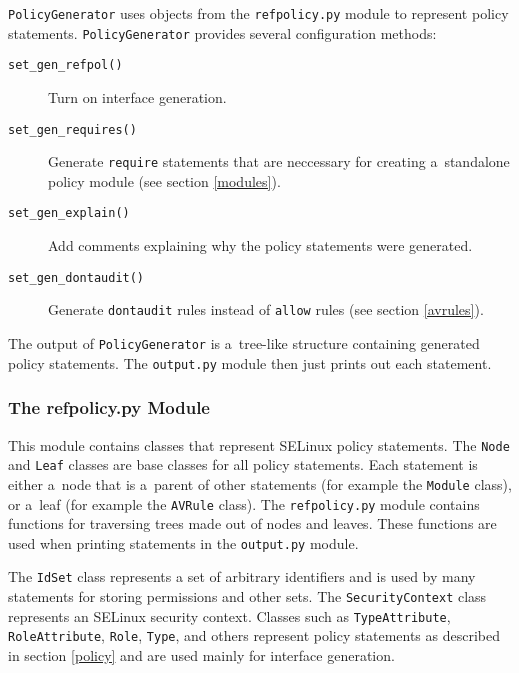 \texttt{PolicyGenerator} uses objects from the \texttt{refpolicy.py} module
to represent policy statements. \texttt{PolicyGenerator} provides several
configuration methods:
\begin{description}
    \item [\texttt{set\_gen\_refpol()}] Turn on interface generation.
    \item [\texttt{set\_gen\_requires()}] Generate \texttt{require} statements
        that are neccessary for creating a~standalone policy module (see section
        \ref{modules}).
    \item [\texttt{set\_gen\_explain()}] Add comments explaining why the policy
        statements were generated.
    \item [\texttt{set\_gen\_dontaudit()}] Generate \texttt{dontaudit} rules
        instead of \texttt{allow} rules (see section \ref{avrules}).
\end{description}
The output of \texttt{PolicyGenerator} is a~tree-like structure containing
generated policy statements. The \texttt{output.py} module then just prints out
each statement.

\subsubsection{The refpolicy.py Module}
This module contains classes that represent SELinux policy statements. The
\texttt{Node} and \texttt{Leaf} classes are base classes for all policy
statements. Each statement is either a~node that is a~parent of other
statements (for example the \texttt{Module} class), or a~leaf (for example the
\texttt{AVRule} class). The \texttt{refpolicy.py} module contains functions for
traversing trees made out of nodes and leaves. These functions are used when
printing statements in the \texttt{output.py} module.

The \texttt{IdSet} class represents a set of arbitrary identifiers and is used
by many statements for storing permissions and other sets. The
\texttt{SecurityContext} class represents an SELinux security context. Classes
such as \texttt{TypeAttribute}, \texttt{RoleAttribute}, \texttt{Role},
\texttt{Type}, and others represent policy statements as described in section
\ref{policy} and are used mainly for interface generation.

